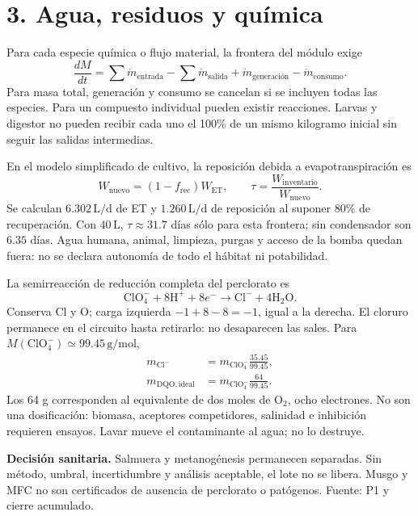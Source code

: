 \documentclass[11pt,a4paper]{article}
\begin{document}
\newpage
\section*{3. Agua, residuos y química}
Para cada especie química o flujo material, la frontera del módulo exige
\begin{equation}
 \frac{dM}{dt}=\sum\dot m_{\mathrm{entrada}}-\sum\dot m_{\mathrm{salida}}+\dot m_{\mathrm{generación}}-\dot m_{\mathrm{consumo}}.
\end{equation}
Para masa total, generación y consumo se cancelan si se incluyen todas las especies.
Para un compuesto individual pueden existir reacciones. Larvas y digestor no pueden
recibir cada uno el 100\% de un mismo kilogramo inicial sin seguir las salidas intermedias.

En el modelo simplificado de cultivo, la reposición debida a evapotranspiración es
\begin{equation}
 W_{\mathrm{nuevo}}=(1-f_{\mathrm{rec}})W_{\mathrm{ET}},\qquad
 \tau=\frac{W_{\mathrm{inventario}}}{W_{\mathrm{nuevo}}}.
\end{equation}
Se calculan $6.302\,\mathrm{L/d}$ de ET y $1.260\,\mathrm{L/d}$ de reposición al suponer
80\% de recuperación. Con $40\,\mathrm L$, $\tau\approx31.7$ días sólo para esta frontera;
sin condensador son $6.35$ días. Agua humana, animal, limpieza, purgas y acceso de la
bomba quedan fuera: no se declara autonomía de todo el hábitat ni potabilidad.

La semirreacción de reducción completa del perclorato es
\begin{equation}
 \mathrm{ClO_4^-}+8\mathrm{H^+}+8e^-\longrightarrow\mathrm{Cl^-}+4\mathrm{H_2O}.
\end{equation}
Conserva Cl y O; carga izquierda $-1+8-8=-1$, igual a la derecha. El cloruro permanece
en el circuito hasta retirarlo: no desaparecen las sales. Para $M(\mathrm{ClO_4^-})
\simeq99.45\,\mathrm{g/mol}$,
\begin{align}
 m_{\mathrm{Cl^-}}&=m_{\mathrm{ClO_4^-}}\frac{35.45}{99.45},\\
 m_{\mathrm{DQO,ideal}}&=m_{\mathrm{ClO_4^-}}\frac{64}{99.45}.
\end{align}
Los 64 g corresponden al equivalente de dos moles de $\mathrm{O_2}$, ocho electrones.
No son una dosificación: biomasa, aceptores competidores, salinidad e inhibición
requieren ensayos. Lavar mueve el contaminante al agua; no lo destruye.

\textbf{Decisión sanitaria.} Salmuera y metanogénesis permanecen separadas. Sin método,
umbral, incertidumbre y análisis aceptable, el lote no se libera. Musgo y MFC no son
certificados de ausencia de perclorato o patógenos. Fuente: P1 y cierre acumulado.
\end{document}
